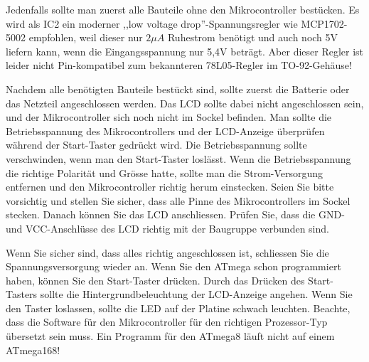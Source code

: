 Jedenfalls sollte man zuerst alle Bauteile ohne den Mikrocontroller bestücken.
Es wird als IC2 ein moderner ,,low voltage drop''-Spannungsregler wie MCP1702-5002 empfohlen, weil
dieser nur \(2\mu A\) Ruhestrom benötigt und auch noch 5V liefern kann, 
 wenn die Eingangsspannung nur 5,4V beträgt.
Aber dieser Regler ist leider nicht Pin-kompatibel zum bekannteren 78L05-Regler im TO-92-Gehäuse!

Nachdem alle benötigten Bauteile bestückt sind, sollte zuerst die Batterie
oder das Netzteil angeschlossen werden. Das LCD sollte dabei nicht angeschlossen sein, und der Mikrocontroller sich noch nicht im Sockel befinden.
Man sollte die Betriebsspannung des Mikrocontrollers und der LCD-Anzeige
überprüfen während der Start-Taster gedrückt wird.
Die Betriebsspannung sollte verschwinden, wenn man den Start-Taster loslässt.
Wenn die Betriebsspannung die richtige Polarität und Grösse hatte,
sollte man die Strom-Versorgung entfernen und den Mikrocontroller 
richtig herum einstecken. Seien Sie bitte vorsichtig und stellen Sie sicher,
dass alle Pinne des Mikrocontrollers im Sockel stecken.
Danach können Sie das LCD anschliessen. Prüfen Sie, dass die GND- und VCC-Anschlüsse des LCD richtig mit der Baugruppe verbunden sind.

Wenn Sie sicher sind, dass alles richtig angeschlossen ist, schliessen Sie
die Spannungsversorgung wieder an.
Wenn Sie den ATmega schon programmiert haben, können Sie den Start-Taster
drücken.
Durch das Drücken des Start-Tasters sollte die Hintergrundbeleuchtung
der LCD-Anzeige angehen.
Wenn Sie den Taster loslassen, sollte die LED auf der Platine schwach leuchten.
Beachte, dass die Software für den Mikrocontroller für den richtigen
Prozessor-Typ übersetzt sein muss. Ein Programm für den ATmega8 läuft
nicht auf einem ATmega168!

